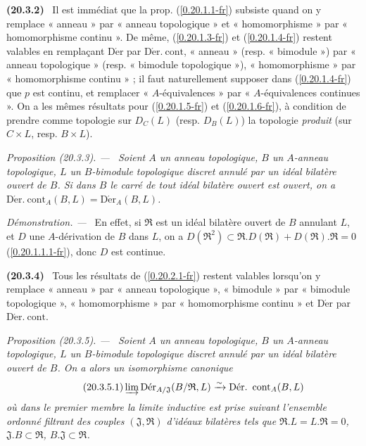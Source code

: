 \documentclass[10pt,oneside]{book}
\makeatletter
\newcommand{\sref}[1]{(\ref{#1})}
\newcommand{\setmanualcurrentlabel}[1]{\def\@currentlabel{#1}}
\newenvironment{env}[1][]{\setmanualcurrentlabel{#1}\par\medskip\noindent\textbf{(#1)}\ }{\par}
\newenvironment{proposition}[1][]{%
  \setmanualcurrentlabel{#1}\par\medskip\noindent\itshape Proposition (#1). ---\ }{\par}
\newenvironment{proof}{%
  \par\medskip\noindent\textit{Démonstration. ---\ }}{\par}
\makeatother
\begin{document}
\begin{env}[20.3.2]
\label{0.20.3.2-fr}
Il est immédiat que la prop. \sref{0.20.1.1-fr} subsiste quand on y remplace
« anneau » par « anneau topologique » et « homomorphisme » par
« homomorphisme continu ». De même, \sref{0.20.1.3-fr} et
\sref{0.20.1.4-fr} restent valables en remplaçant $\operatorname{D\acute{e}r}$ par
$\operatorname{D\acute{e}r.\ cont}$, « anneau » (resp. « bimodule ») par « anneau
topologique » (resp. « bimodule topologique »), « homomorphisme » par
« homomorphisme continu » ; il faut naturellement supposer dans
\sref{0.20.1.4-fr} que $p$ est continu, et remplacer « $A$-équivalences » par
« $A$-équivalences continues ». On a les mêmes résultats pour
\sref{0.20.1.5-fr} et \sref{0.20.1.6-fr}, à condition de prendre comme
topologie sur $D_C(L)$ (resp. $D_B(L)$) la topologie \emph{produit} (sur
$C\times L$, resp. $B\times L$).
\end{env}

\begin{proposition}[20.3.3]
\label{0.20.3.3-fr}
Soient $A$ un anneau topologique, $B$ un $A$-anneau topologique, $L$ un
$B$-bimodule topologique discret annulé par un idéal bilatère ouvert de $B$.
Si dans $B$ le carré de tout idéal bilatère ouvert est ouvert, on a
$\operatorname{D\acute{e}r.\ cont}_A(B,L)=\operatorname{D\acute{e}r}_A(B,L)$.
\end{proposition}

\begin{proof}
En effet, si $\mathfrak{R}$ est un idéal bilatère ouvert de $B$ annulant $L$,
et $D$ une $A$-dérivation de $B$ dans $L$, on a
$D(\mathfrak{R}^2)\subset\mathfrak{R}.D(\mathfrak{R})+
D(\mathfrak{R}).\mathfrak{R}=0$ \sref{0.20.1.1.1-fr}, donc $D$ est continue.
\end{proof}

\begin{env}[20.3.4]
\label{0.20.3.4-fr}
Tous les résultats de \sref{0.20.2.1-fr} restent valables lorsqu'on y remplace
« anneau » par « anneau topologique », « bimodule » par « bimodule
topologique », « homomorphisme » par « homomorphisme continu » et
$\operatorname{D\acute{e}r}$ par $\operatorname{D\acute{e}r.\ cont}$.
\end{env}

\begin{proposition}[20.3.5]
\label{0.20.3.5-fr}
Soient $A$ un anneau topologique, $B$ un $A$-anneau topologique, $L$ un
$B$-bimodule topologique discret annulé par un idéal bilatère ouvert de $B$.
On a alors un isomorphisme canonique
\begin{equation}
\tag{20.3.5.1}
\label{0.20.3.5.1-fr}
  \varinjlim\operatorname{D\acute{e}r}_{A/\mathfrak{J}}
  (B/\mathfrak{R},L)\xrightarrow{\sim}
  \operatorname{D\acute{e}r.\ cont}_A(B,L)
\end{equation}
où dans le premier membre la limite inductive est prise suivant l'ensemble
ordonné filtrant des couples $(\mathfrak{J},\mathfrak{R})$ d'idéaux bilatères
tels que $\mathfrak{R}.L=L.\mathfrak{R}=0$,
$\mathfrak{J}.B\subset\mathfrak{R}$,
$B.\mathfrak{J}\subset\mathfrak{R}$.
\end{proposition}
\end{document}
